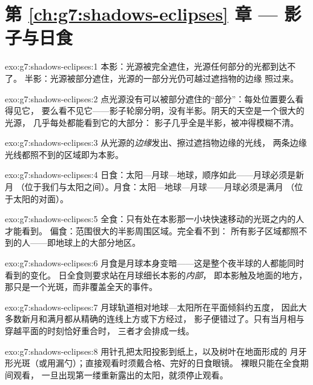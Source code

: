 \section*{第 \ref{ch:g7:shadows-eclipses} 章 --- 影子与日食}

\begin{solution}{exo:g7:shadows-eclipses:1}
本影：光源被完全遮住，光源任何部分的光都到达不了。
半影：光源被部分遮住，光源的一部分光仍可越过遮挡物的边缘
照过来。
\end{solution}

\begin{solution}{exo:g7:shadows-eclipses:2}
点光源没有可以被部分遮住的“部分”：每处位置要么看得见它，
要么看不见它——影子轮廓分明，没有半影。阴天的天空是一个很大的光源，
几乎每处都能看到它的大部分：
影子几乎全是半影，被冲得模糊不清。
\end{solution}

\begin{solution}{exo:g7:shadows-eclipses:3}
从光源的\emph{边缘}发出、擦过遮挡物边缘的光线，
两条边缘光线都照不到的区域即为本影。
\end{solution}

\begin{solution}{exo:g7:shadows-eclipses:4}
日食：太阳—月球—地球，顺序如此——月球必须是新月
（位于我们与太阳之间）。月食：太阳—地球—月球——月球必须是满月
（位于太阳的对面）。
\end{solution}

\begin{solution}{exo:g7:shadows-eclipses:5}
全食：只有处在本影那一小块快速移动的光斑之内的人才能看到。
偏食：范围很大的半影周围区域。完全看不到：
所有影子区域都照不到的人——即地球上的大部分地区。
\end{solution}

\begin{solution}{exo:g7:shadows-eclipses:6}
月食是月球本身变暗——这是整个夜半球的人都能同时看到的变化。
日全食则要求站在月球细长本影的\emph{内部}，
即本影触及地面的地方，
那只是一个光斑，而非覆盖全天的事件。
\end{solution}

\begin{solution}{exo:g7:shadows-eclipses:7}
月球轨道相对地球—太阳所在平面倾斜约五度，
因此大多数新月和满月都从精确的连线上方或下方经过，
影子便错过了。只有当月相与穿越平面的时刻恰好重合时，
三者才会排成一线。
\end{solution}

\begin{solution}{exo:g7:shadows-eclipses:8}
用针孔把太阳投影到纸上，以及树叶在地面形成的
月牙形光斑（或用漏勺）；直接观看时须戴合格、完好的日食眼镜。
裸眼只能在全食期间观看，
一旦出现第一缕重新露出的太阳，就须停止观看。
\end{solution}

